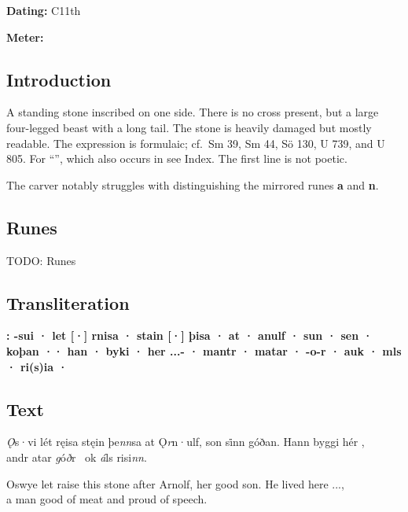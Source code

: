 \begin{flushright}%
\textbf{Dating:} C11th

\textbf{Meter:} \Fornyrdislag
\end{flushright}%

\subsection{Introduction}

A standing stone inscribed on one side.  There is no cross present, but a large four-legged beast with a long tail.  The stone is heavily damaged but mostly readable.  The expression is formulaic; cf.~Sm 39, Sm 44, Sö 130, U 739, and U 805.  For “”, which also occurs in  see Index.  The first line is not poetic.

The carver notably struggles with distinguishing the mirrored runes \textbf{a} and \textbf{n}.

\subsection{Runes}

TODO: Runes%

\subsection{Transliteration}

\textbf{: -sui · let [·] rnisa · stain [·] þisa · at · anulf · sun · sen · koþan ·· han · byki · her ...- · mantr · matar · -o-r · auk · mls · ri(s)ia ·}

\subsection{Text}

\bpg\bpa[0]%
\emph{Ǫ̇}s·vi lét ręisa stęin þe\emph{nn}sa at Ǫ\emph{r}n·ulf, son si̇nn góðan. Hann byggi hér , \\
andr atar \emph{g}ó\emph{ð}r \hld\ ok \emph{á}ls risi\emph{nn}.\epa

\bvb Oswye let raise this stone after Arnolf, her good son. He lived here ..., \\
a man good of meat and proud of speech.\evb\evg

\sectionline\clearpage


